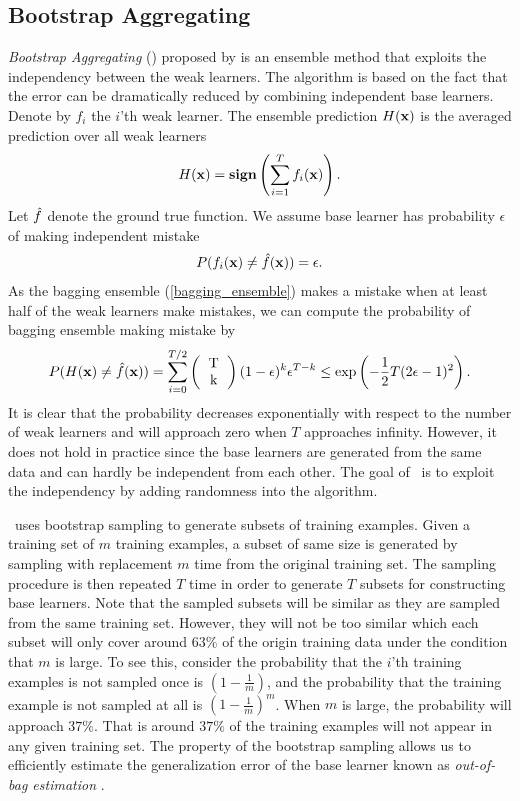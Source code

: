 {\subsection{Bootstrap Aggregating} \label{sc_ba}

\textit{Bootstrap Aggregating} (\bagging) proposed by \citet{Breiman96bagging} is an ensemble method that exploits the independency between the weak learners.
The algorithm is based on the fact that the error can be dramatically reduced by combining independent base learners.
Denote by $f_i$ the $i$'th weak learner.
The ensemble prediction $H(\mathbf {x})$ is the averaged prediction over all weak learners
\begin{align}
	H(\mathbf {x}) = \textbf{sign}\left(\sum_{i=1}^{T}f_i(\mathbf {x})\right). \label{bagging_ensemble}
\end{align}
Let ${\hat{f}}$ denote the ground true function.
We assume base learner has probability $\epsilon$ of making independent mistake
\begin{align*}
	P(f_i(\mathbf {x}) \ne {\hat{f}}(\mathbf {x})) = \epsilon.
\end{align*}
As the bagging ensemble (\ref{bagging_ensemble}) makes a mistake when at least half of the weak learners make mistakes, we can compute the probability of bagging ensemble making mistake by
\begin{align*}
	P(H(\vx)\neq\hatf(\vx)) = \sum_{i=0}^{T/2}\left(\begin{tabular}{cc}T\\k\end{tabular}\right)(1-\epsilon)^k\epsilon^{T-k} \le\exp\left(-\frac{1}{2}T(2\epsilon-1)^2\right).
\end{align*}
It is clear that the probability decreases exponentially with respect to the number of weak learners and will approach zero when $T$ approaches infinity.
However, it does not hold in practice since the base learners are generated from the same data and can hardly be independent from each other.
The goal of \bagging\ is to exploit the independency by adding randomness into the algorithm.

\bagging\ uses bootstrap sampling \citep{Efron1994introduction} to generate subsets of training examples.
Given a training set of $m$ training examples, a subset of same size is generated by sampling with replacement $m$ time from the original training set.
The sampling procedure is then repeated $T$ time in order to generate $T$ subsets for constructing base learners.
Note that the sampled subsets will be similar as they are sampled from the same training set.
However, they will not be too similar which each subset will only cover around $63\%$ of the origin training data under the condition that $m$ is large.
To see this, consider the probability that the $i$'th training examples is not sampled once is $(1-\frac{1}{m})$, and the probability that the training example is not sampled at all is $(1-\frac{1}{m})^m$.
When $m$ is large, the probability will approach $37\%$. 
That is around $37\%$ of the training examples will not appear in any given training set.
The property of the bootstrap sampling allows us to efficiently estimate the generalization error of the base learner known as \textit{out-of-bag estimation} \citep{Breiman96out,Tibshirani1996bias,Wolpert99an}.

}
